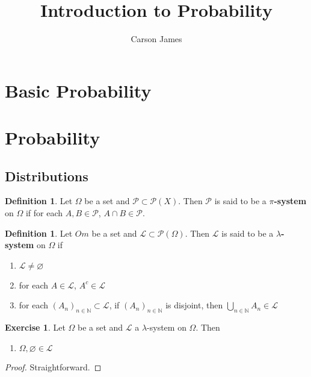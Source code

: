 \documentclass[12pt]{amsart}
\theoremstyle{definition}
\newtheorem{defn}[definition]{Definition}
\newtheorem{ex}[definition]{Exercise}
\newcommand{\lam}{\lambda}
\newcommand{\Om}{\Omega}
\newcommand{\N}{\mathbb{N}}
\newcommand{\ML}{\mathcal{L}}
\newcommand{\MP}{\mathcal{P}}
\begin{document}
	
	\title{Introduction to Probability}
	\author{Carson James}
	\maketitle
	
	\tableofcontents
	
	
	
	
	
	
	
	\newpage
	\section{Basic Probability}
	
	\section{Probability}
	\subsection{Distributions}
	
	\begin{defn}
		Let $\Om$ be a set and $\MP \subset \MP(X)$. Then $\MP$ is said to be a \textbf{$\pi$-system} on $\Om$ if for each $A,B \in \MP$, $A \cap B \in \MP$.
	\end{defn}
	
	\begin{defn}
		Let $Om$ be a set and $\ML \subset \MP(\Om)$. Then $\ML$ is said to be a \textbf{$\lam$-system} on $\Om$ if 
		\begin{enumerate}
			\item $\ML \neq \varnothing$
			\item for each $A \in \ML$, $A^c \in \ML$
			\item for each $(A_n)_{n \in \N} \subset \ML$, if $(A_n)_{n \in \N}$ is disjoint, then $\bigcup\limits_{n \in \N}A_n \in \ML$
		\end{enumerate}
	\end{defn}
	
	\begin{ex}
		Let $\Om$ be a set and $\ML$ a $\lam$-system on $\Om$. Then 
		\begin{enumerate}
			\item $\Om, \varnothing \in \ML$
		\end{enumerate} 
	\end{ex}
	
	\begin{proof}
		Straightforward.
	\end{proof}
	
\end{document}
